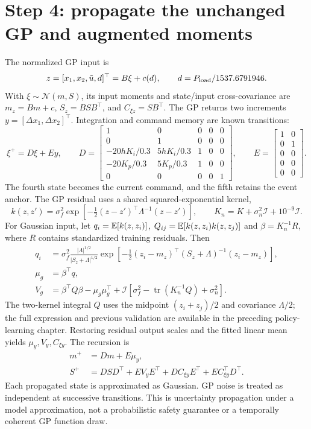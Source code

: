 \section{Step 4: propagate the unchanged GP and augmented moments}
The normalized GP input is
\begin{equation}
z=[x_1,x_2,\tilde u,d]^\top=B\xi+c(d),\qquad d=P_{\rm load}/1537.6791946.
\end{equation}
With $\xi\sim\mathcal N(m,S)$, its input moments and state/input cross-covariance are $m_z=Bm+c$, $S_z=BSB^\top$, and $C_{\xi z}=SB^\top$. The GP returns two increments $y=[\Delta x_1,\Delta x_2]^\top$. Integration and command memory are known transitions:
\begin{equation}
\xi^+=D\xi+Ey,\qquad
D=\begin{bmatrix}
1&0&0&0&0\\0&1&0&0&0\\-20hK_i/0.3&5hK_i/0.3&1&0&0\\
-20K_p/0.3&5K_p/0.3&1&0&0\\0&0&0&0&1
\end{bmatrix},\qquad E=\begin{bmatrix}1&0\\0&1\\0&0\\0&0\\0&0\end{bmatrix}.
\end{equation}
The fourth state becomes the current command, and the fifth retains the event anchor. The GP residual uses a shared squared-exponential kernel,
\begin{equation}
k(z,z')=\sigma_f^2\exp[-\tfrac12(z-z')^\top\Lambda^{-1}(z-z')],\qquad K_n=K+\sigma_n^2\mathcal I+10^{-9}\mathcal I.
\end{equation}
For Gaussian input, let $q_i=\mathbb{E}[k(z,z_i)]$, $Q_{ij}=\mathbb{E}[k(z,z_i)k(z,z_j)]$ and $\beta=K_n^{-1}R$, where $R$ contains standardized training residuals. Then
\begin{align}
q_i&=\sigma_f^2\frac{|\Lambda|^{1/2}}{|S_z+\Lambda|^{1/2}}
\exp[-\tfrac12(z_i-m_z)^\top(S_z+\Lambda)^{-1}(z_i-m_z)],\\
\mu_g&=\beta^\top q,\\
V_g&=\beta^\top Q\beta-\mu_g\mu_g^\top+
\mathcal I[\sigma_f^2-\operatorname{tr}(K_n^{-1}Q)+\sigma_n^2].
\end{align}
The two-kernel integral $Q$ uses the midpoint $(z_i+z_j)/2$ and covariance $\Lambda/2$; the full expression and previous validation are available in the preceding policy-learning chapter. Restoring residual output scales and the fitted linear mean yields $\mu_y,V_y,C_{\xi y}$. The recursion is
\begin{align}
m^+&=Dm+E\mu_y,\\
S^+&=DSD^\top+EV_yE^\top+DC_{\xi y}E^\top+EC_{\xi y}^\top D^\top.
\end{align}
Each propagated state is approximated as Gaussian. GP noise is treated as independent at successive transitions. This is uncertainty propagation under a model approximation, not a probabilistic safety guarantee or a temporally coherent GP function draw.

